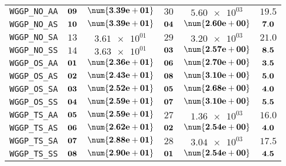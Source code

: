 \begin{xltabular}{\textwidth}{l||CC|CC||C}
	\texttt{WGGP\_NO\_AA} & $\bf 09$ & $\bf \num{3.39e+01}$ & $ 30$ & $ \num{5.60e+03}$ &$ 19.5$  \\
	\texttt{WGGP\_NO\_AS} & $\bf 10$ & $\bf \num{3.39e+01}$ & $\bf 04$ & $\bf \num{2.60e+00}$ &$\bf 7.0$  \\
	\texttt{WGGP\_NO\_SA} & $ 13$ & $ \num{3.61e+01}$ & $ 29$ & $ \num{3.20e+03}$ &$ 21.0$  \\
	\texttt{WGGP\_NO\_SS} & $ 14$ & $ \num{3.63e+01}$ & $\bf 03$ & $\bf \num{2.57e+00}$ &$\bf 8.5$  \\
	\texttt{WGGP\_OS\_AA} & $\bf 01$ & $\bf \num{2.36e+01}$ & $\bf 06$ & $\bf \num{2.70e+00}$ &$\bf 3.5$  \\
	\texttt{WGGP\_OS\_AS} & $\bf 02$ & $\bf \num{2.43e+01}$ & $\bf 08$ & $\bf \num{3.10e+00}$ &$\bf 5.0$  \\
	\texttt{WGGP\_OS\_SA} & $\bf 03$ & $\bf \num{2.52e+01}$ & $\bf 05$ & $\bf \num{2.68e+00}$ &$\bf 4.0$  \\
	\texttt{WGGP\_OS\_SS} & $\bf 04$ & $\bf \num{2.59e+01}$ & $\bf 07$ & $\bf \num{3.10e+00}$ &$\bf 5.5$  \\
	\texttt{WGGP\_TS\_AA} & $\bf 05$ & $\bf \num{2.59e+01}$ & $ 27$ & $ \num{1.36e+03}$ &$ 16.0$  \\
	\texttt{WGGP\_TS\_AS} & $\bf 06$ & $\bf \num{2.62e+01}$ & $\bf 02$ & $\bf \num{2.54e+00}$ &$\bf 4.0$  \\
	\texttt{WGGP\_TS\_SA} & $\bf 07$ & $\bf \num{2.88e+01}$ & $ 28$ & $ \num{3.04e+03}$ &$ 17.5$  \\
	\texttt{WGGP\_TS\_SS} & $\bf 08$ & $\bf \num{2.90e+01}$ & $\bf 01$ & $\bf \num{2.54e+00}$ &$\bf 4.5$  \\
\end{xltabular}
